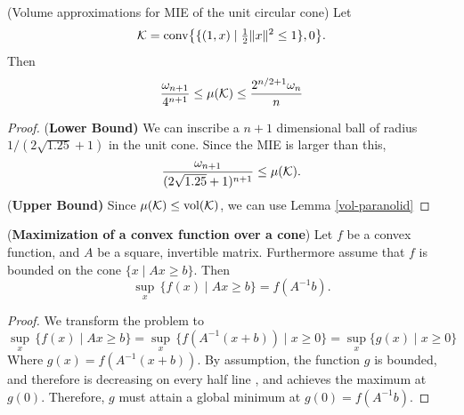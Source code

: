 \begin{lem} (Volume approximations for MIE of the unit circular cone)
Let 
$$\mathcal{K} = \mbox{\normalfont conv}\big\{\{(1,x)\mid \tfrac{1}{2}\|x\|^2\leq1\},0\big\}.$$ Then $$ \frac{\omega_{n+1}}{4^{n+1}} \leq \mu({\mathcal{K}}) \leq \frac{2^{n/2+1}\omega_{n}}{n}$$
\end{lem}
\begin{proof} {(\bf{Lower Bound})} We can inscribe a $n+1$ dimensional ball of radius $1/(2\sqrt{1.25} + 1)$ in the unit cone. Since the MIE is larger than this,
$$\frac{\omega_{n+1}}{(2\sqrt{1.25}+1)^{n+1}} \leq \mu(\mathcal{K}).$$
{(\bf{Upper Bound})} Since $\mu(\mathcal{K}) \leq \mbox{vol}(\mathcal{K})$, we can use Lemma \ref{vol-paranolid}
\end{proof}

\begin{lem}\label{lem:maximization_convex}
({\bf Maximization of a convex function over a cone}) Let $f$ be
a convex function, and $A$ be a square, invertible matrix. Furthermore assume that $f$ is bounded on the
cone $\{x\mid Ax\geq b\}$. Then 
\[
\sup_{x}\,\{f(x)\mid Ax\geq b\} = f(A^{-1}b).
\]
\end{lem}
\begin{proof}
We transform the problem to 
\[
\sup_{x}\,\{f(x)\mid Ax\geq b\}=\sup_{x}\,\{f(A^{-1}(x+b))\mid x\geq0\}=\sup_{x}\{g(x)\mid x\geq0\}
\]
Where $g(x)=f(A^{-1}(x+b))$. By assumption, the function $g$ is bounded, and
therefore is decreasing on every half line \cite{Roc70}, and achieves the
maximum at $g(0)$. Therefore, $g$ must attain a global minimum at $g(0)=f(A^{-1}b)$.
\end{proof}

